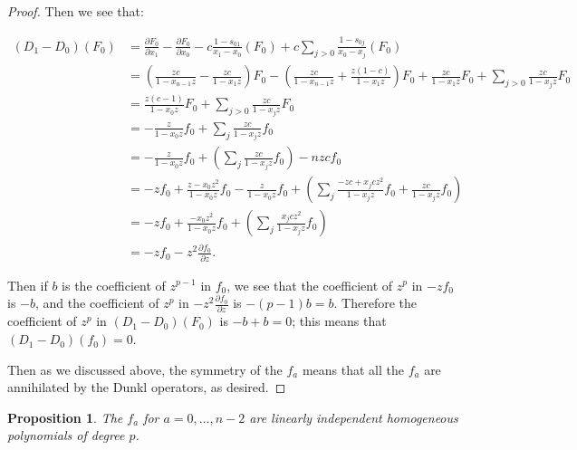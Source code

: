 \documentclass{article}
\numberwithin{equation}{section}
\newtheorem{proposition}[equation]{Proposition}
\begin{document}
\begin{proof}
Then we see that:

\begin{align*}
(D_1-D_0)(F_0)&=\frac{\partial F_0}{\partial x_1}-\frac{\partial F_0}{\partial x_0}-c\frac{1-s_{01}}{x_1-x_0}(F_0)+c\sum_{j>0}\frac{1-s_{0j}}{x_0-x_j}(F_0)\\
&=\left(\frac{zc}{1-x_{n-1}z}-\frac{zc}{1-x_1z}\right)F_0-\left(\frac{zc}{1-x_{n-1}z}+\frac{z(1-c)}{1-x_1z}\right)F_0+\frac{zc}{1-x_1z}F_0+\sum_{j>0}\frac{zc}{1-x_jz}F_0\\
&=\frac{z(c-1)}{1-x_0z}F_0+\sum_{j>0}\frac{zc}{1-x_jz}F_0\\
&=-\frac{z}{1-x_0z}f_0+\sum_{j} \frac{zc}{1-x_jz}f_0\\
&=-\frac{z}{1-x_0z}f_0+\left(\sum_{j} \frac{zc}{1-x_jz}f_0\right)-nzcf_0\\
&=-zf_0+\frac{z-x_0z^2}{1-x_0z}f_0-\frac{z}{1-x_0z}f_0+\left(\sum_{j} \frac{-zc+x_jcz^2}{1-x_jz}f_0+\frac{zc}{1-x_jz}f_0\right)\\
&=-zf_0+\frac{-x_0z^2}{1-x_0z}f_0+\left(\sum_{j} \frac{x_jcz^2}{1-x_jz}f_0\right)\\
&=-zf_0-z^2\frac{\partial f_0}{\partial z}.
\end{align*}

Then if $b$ is the coefficient of $z^{p-1}$ in $f_0$, we see that the coefficient of $z^p$ in $-zf_0$ is $-b$, and the coefficient of $z^p$ in $-z^2\frac{\partial f_0}{\partial z}$ is $-(p-1)b=b$. Therefore the coefficient of $z^p$ in $(D_1-D_0)(F_0)$ is $-b+b=0$; this means that $(D_1-D_0)(f_0)=0$. 

Then as we discussed above, the symmetry of the $f_a$ means that all the $f_a$ are annihilated by the Dunkl operators, as desired.

\end{proof}

\begin{proposition}\label{prop:linind} The $f_a$ for $a=0,\dots,n-2$ are linearly independent homogeneous polynomials of degree $p$.%
\end{proposition} 
\end{document}
